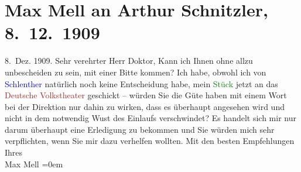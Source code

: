 

               \section[Max Mell an Arthur Schnitzler, 8. 12. 1909]{ Max Mell an Arthur Schnitzler, 8. 12. 1909}\nopagebreak{}\rehead{ }\normalsize\beginnumbering{} \toendnotes[C]{\smallbreak\pagebreak[2]} 
\toendnotes[C]{\smallbreak}\pstart
           \raggedleft{}{\pb}8. Dez. 1909.\pend
           \pstart{}Sehr verehrter Herr Doktor,\pend\pstart
           Kann ich Ihnen ohne allzu unbescheiden zu sein, mit einer Bitte kommen? Ich habe,
                    obwohl ich von \textcolor{blue}{Schlenther}{}\ledrightnote{\textcolor{blue}{Paul Schlenther}} natürlich noch keine
                    Entscheidung habe, mein \textcolor{green}{Stück}{}
                    jetzt an das \textcolor{brown}{Deutsche Volkstheater}{}\ledrightnote{\textcolor{brown}{Volkstheater}} geschickt – würden
                    Sie die Güte haben mit einem Wort bei der Direktion nur dahin zu wirken, dass es
                    überhaupt angesehen wird und nicht in dem notwendig \label{T_L01894_1v}\label{T_L01894_1h} Wust des Einlaufs
                    verschwindet? Es handelt sich mir nur darum überhaupt eine Erledigung zu
                    bekommen und Sie würden mich sehr verpflichten, wenn Sie mir dazu verhelfen
                    wollten.\pend
           \pstart
           Mit den besten Empfehlungen{\\[\baselineskip]}Ihres{\\[\baselineskip]}Max Mell\pend
           \leftskip=0em{}\endnumbering{}  
      